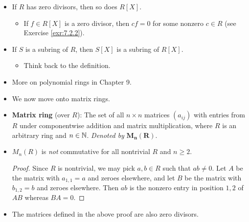 \documentclass[../notes.tex]{subfiles}
\begin{document}
\begin{itemize}
\begin{proposition}
\begin{enumerate}
\begin{proof}
\begin{equation*}
                    \deg p(X)+\deg q(X) = \deg p(X)q(X) = 0
                    \quad\Longleftrightarrow\quad
                    \deg p(X)=\deg q(X) = 0
                \end{equation*}
                Therefore, $p(X),q(X)\in R$ and hence are units of $R$, as desired.
            \end{proof}
            \item $R[X]$ is an integral domain.
            \begin{proof}
                We have already established that the commutativity and identity of $R[X]$ follow from $R$. As to no zero divisors, this constraint follows from part (1).
            \end{proof}
        \end{enumerate}
    \end{proposition}
    \item If $R$ has zero divisors, then so does $R[X]$.
    \begin{itemize}
        \item If $f\in R[X]$ is a zero divisor, then $cf=0$ for some nonzero $c\in R$ (see Exercise \ref{exr:7.2.2}).
    \end{itemize}
    \item If $S$ is a subring of $R$, then $S[X]$ is a subring of $R[X]$.
    \begin{itemize}
        \item Think back to the definition.
    \end{itemize}
    \item More on polynomial rings in Chapter 9.
    \item {}We now move onto matrix rings.
    \item \textbf{Matrix ring} (over $R$): The set of all $n\times n$ matrices $(a_{ij})$ with entries from $R$ under componentwise addition and matrix multiplication, where $R$ is an arbitrary ring and $n\in\mathbb{N}$. \emph{Denoted by} $\bm{M_n(R)}$.
    \item $M_n(R)$ is \emph{not} commutative for all nontrivial $R$ and $n\geq 2$.
    \begin{proof}
        Since $R$ is nontrivial, we may pick $a,b\in R$ such that $ab\neq 0$. Let $A$ be the matrix with $a_{1,1}=a$ and zeroes elsewhere, and let $B$ be the matrix with $b_{1,2}=b$ and zeroes elsewhere. Then $ab$ is the nonzero entry in position $1,2$ of $AB$ whereas $BA=0$.
    \end{proof}
    \item The matrices defined in the above proof are also zero divisors.

\end{itemize}
\end{document}

